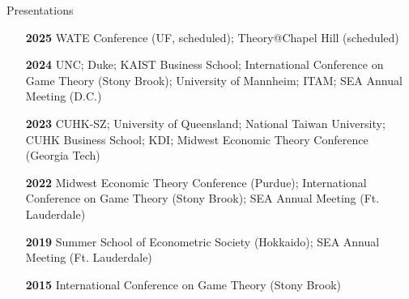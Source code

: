\begin{rSection}{Presentations}

\begin{itemize}
	\item [\textbf{2025}] WATE Conference (UF, scheduled); Theory@Chapel Hill (scheduled)
	\item [\textbf{2024}] UNC; Duke; KAIST Business School; International Conference on Game Theory (Stony Brook); University of Mannheim; ITAM; SEA Annual Meeting (D.C.)
	\item [\textbf{2023}] CUHK-SZ; University of Queensland; National Taiwan University; CUHK Business School; KDI; Midwest Economic Theory Conference (Georgia Tech)
	\item [\textbf{2022}] Midwest Economic Theory Conference (Purdue); International Conference on Game Theory (Stony Brook); SEA Annual Meeting (Ft. Lauderdale)
	\item [\textbf{2019}] Summer School of Econometric Society (Hokkaido); SEA Annual Meeting (Ft. Lauderdale)
	\item [\textbf{2015}] International Conference on Game Theory (Stony Brook)
\end{itemize}
	

\end{rSection}